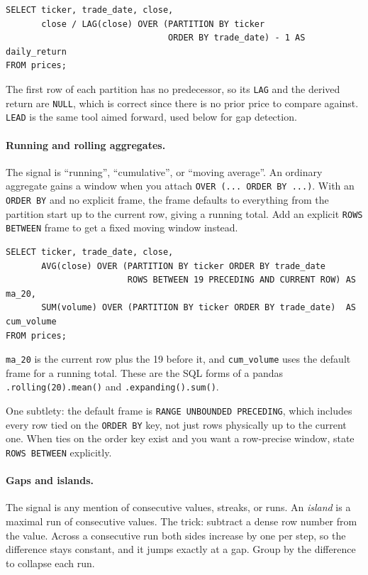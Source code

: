 \begin{lstlisting}[style=sql, caption={Daily returns per ticker with LAG}]
SELECT ticker, trade_date, close,
       close / LAG(close) OVER (PARTITION BY ticker
                                ORDER BY trade_date) - 1 AS daily_return
FROM prices;
\end{lstlisting}

\vspace{-1ex}

The first row of each partition has no predecessor, so its \texttt{LAG} and the
derived return are \texttt{NULL}, which is correct since there is no prior price
to compare against. \texttt{LEAD} is the same tool aimed forward, used below for
gap detection.

\paragraph{Running and rolling aggregates.} The signal is ``running'',
``cumulative'', or ``moving average''. An ordinary aggregate gains a window when
you attach \texttt{OVER (... ORDER BY ...)}. With an \texttt{ORDER BY} and no
explicit frame, the frame defaults to everything from the partition start up to
the current row, giving a running total. Add an explicit \texttt{ROWS BETWEEN}
frame to get a fixed moving window instead.

\begin{lstlisting}[style=sql, caption={20-day moving average and running volume}]
SELECT ticker, trade_date, close,
       AVG(close) OVER (PARTITION BY ticker ORDER BY trade_date
                        ROWS BETWEEN 19 PRECEDING AND CURRENT ROW) AS ma_20,
       SUM(volume) OVER (PARTITION BY ticker ORDER BY trade_date)  AS cum_volume
FROM prices;
\end{lstlisting}

\vspace{-1ex}

\texttt{ma\_20} is the current row plus the 19 before it, and \texttt{cum\_volume}
uses the default frame for a running total. These are the SQL forms of a pandas
\texttt{.rolling(20).mean()} and \texttt{.expanding().sum()}.

One subtlety: the default frame is \texttt{RANGE UNBOUNDED PRECEDING}, which
includes every row tied on the \texttt{ORDER BY} key, not just rows physically
up to the current one. When ties on the order key exist and you want a
row-precise window, state \texttt{ROWS BETWEEN} explicitly.

\paragraph{Gaps and islands.} The signal is any mention of consecutive values,
streaks, or runs. An \emph{island} is a maximal run of consecutive values. The
trick: subtract a dense row number from the value. Across a consecutive run
both sides increase by one per step, so the difference stays constant, and it
jumps exactly at a gap. Group by the difference to collapse each run.

